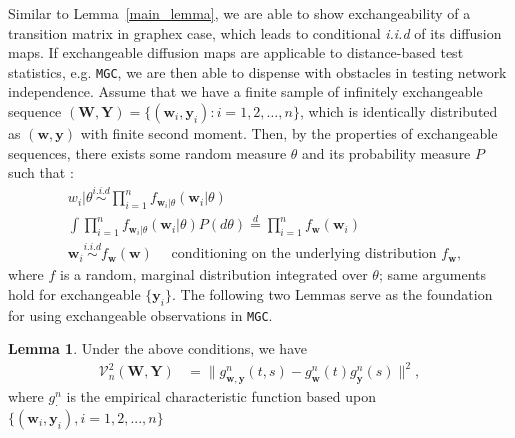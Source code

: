 \documentclass[12pt]{article}
\theoremstyle{definition}
\newtheorem{lemma}[theorem]{Lemma}
\begin{document}
Similar to Lemma~\ref{main_lemma}, we are able to show exchangeability of a transition matrix in graphex case, which leads to conditional \textit{i.i.d} of its diffusion maps. If exchangeable diffusion maps are applicable to distance-based test statistics, e.g. \texttt{MGC}, we are then able to dispense with obstacles in testing network independence. Assume that we have a finite sample of infinitely exchangeable sequence $(\mathbf{W}, \mathbf{Y}) = \{ ( \mathbf{w}_{i}, \mathbf{y}_{i} ) : i=1,2, \ldots, n \}$, which is identically distributed as $(\mathbf{w}, \mathbf{y})$ with finite second moment. Then, by the properties of exchangeable sequences, there exists some random measure $\theta$ and its probability measure $P$ such that : 
\begin{equation}
\begin{split}
& w_{i} | \theta  \overset{i.i.d}{\sim} \prod\limits_{i=1}^{n} f_{\mathbf{w}_{i} | \theta}(\mathbf{w}_{i} | \theta)  \\
& \int \prod\limits_{i=1}^{n} f_{ \mathbf{w}_{i} | \theta} ( \mathbf{w}_{i} | \theta ) P(d\theta)  \stackrel{d}{=}   \prod\limits_{i=1}^{n} f_{\mathbf{w}}(\mathbf{w}_{i})  \\
& \mathbf{w}_{i}   \overset{i.i.d}{\sim}  f_{\mathbf{w}}(\mathbf{w})  \quad \mbox{ conditioning on the underlying distribution } f_{\mathbf{w}},
\end{split}
\label{eq:iid}
\end{equation}
where $f$ is a random, marginal distribution integrated over $\theta$; same arguments hold for exchangeable $\{ \mathbf{y}_{i}  \}$. The following two Lemmas serve as the foundation for using exchangeable observations in \texttt{MGC}.

\begin{lemma}
	\label{lemma1}
   Under the above conditions, we have 
	\begin{eqnarray*}
		\mathcal{V}^{2}_{n}(\mathbf{W},\mathbf{Y}) &= \|g_{\mathbf{w},\mathbf{y}}^{n}(t,s)-g_{\mathbf{w}}^{n}(t)g_{\mathbf{y}}^{n}(s)\|^{2},
	\end{eqnarray*}
	where $g_{\cdot}^{n}$ is the empirical characteristic function based upon $\{(\mathbf{w}_{i},\mathbf{y}_{i}), i=1,2,...,n\}$
\end{lemma}
\end{document}
